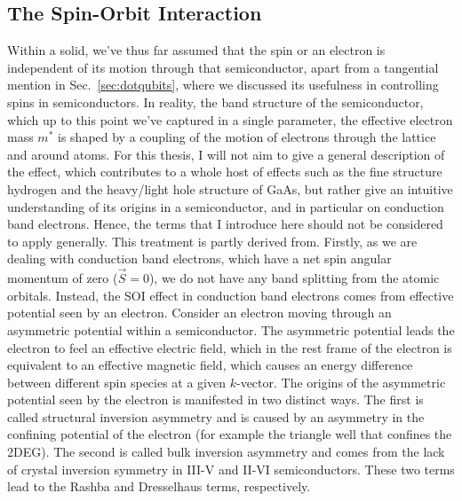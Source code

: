 \subsection{The Spin-Orbit Interaction}
\label{sec:SOI}
Within a solid, we've thus far assumed that the spin or an electron is independent of its motion through that semiconductor, apart from
a tangential mention in Sec.~\ref{sec:dotqubits}, where we discussed its usefulness in controlling spins in semiconductors. In reality, the
band structure of the semiconductor, which up to this point we've captured in a single parameter, the effective electron mass $m^*$ is shaped
by a coupling of the motion of electrons through the lattice and around atoms. For this thesis, I will not aim to give a general description of
the effect, which contributes to a whole host of effects such as the fine structure hydrogen and the heavy/light hole structure of GaAs,
but rather give an intuitive understanding of its origins in a semiconductor, and in particular on conduction band electrons. Hence, the terms that
I introduce here should not be considered to apply generally. This treatment is partly derived from\cite{winkler2003spin,dyakonov2017spin}.
Firstly, as we are dealing with conduction band electrons, which have a net spin angular momentum of
zero ($\vec S = 0$), we do not have any band splitting from the atomic orbitals. Instead, the SOI effect in conduction band electrons comes from effective
potential seen by an electron. Consider an electron moving through an asymmetric potential within a semiconductor. The asymmetric potential leads the
electron to feel an effective electric field, which in the rest frame of the electron is equivalent to an effective magnetic field, which causes an energy difference
between different spin species at a given $k$-vector. The origins of the asymmetric potential seen by the electron is manifested in two distinct ways. The first is called structural inversion asymmetry and is caused by an asymmetry in the confining potential of the electron (for example the triangle well that confines the 2DEG). The second is called bulk inversion asymmetry and comes from the lack of crystal inversion symmetry in III-V and II-VI semiconductors. These two terms lead to the Rashba and Dresselhaus terms, respectively.

